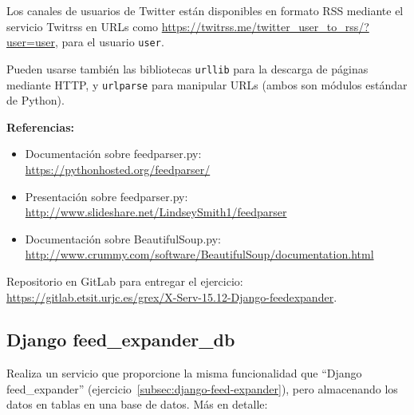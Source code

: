 Los canales de usuarios de Twitter están disponibles en formato RSS mediante el servicio Twitrss en URLs como \url{https://twitrss.me/twitter_user_to_rss/?user=user}, para el usuario \texttt{user}.

Pueden usarse también las bibliotecas \texttt{urllib} para la descarga de páginas mediante HTTP, y \texttt{urlparse} para manipular URLs (ambos son módulos estándar de Python).

\textbf{Referencias:}

\begin{itemize}
\item Documentación sobre feedparser.py: \\
  \url{https://pythonhosted.org/feedparser/}
\item Presentación sobre feedparser.py: \\
  \url{http://www.slideshare.net/LindseySmith1/feedparser}
\item Documentación sobre BeautifulSoup.py: \\
  \url{http://www.crummy.com/software/BeautifulSoup/documentation.html}
\end{itemize}


Repositorio en GitLab para entregar el ejercicio: \\ 
\url{https://gitlab.etsit.urjc.es/grex/X-Serv-15.12-Django-feedexpander}.


\subsection{Django feed\_expander\_db}
\label{subsec:django-feed-expander-db}

Realiza un servicio que proporcione la misma funcionalidad que ``Django feed\_expander'' (ejercicio~\ref{subsec:django-feed-expander}), pero almacenando los datos en tablas en una base de datos. Más en detalle:

